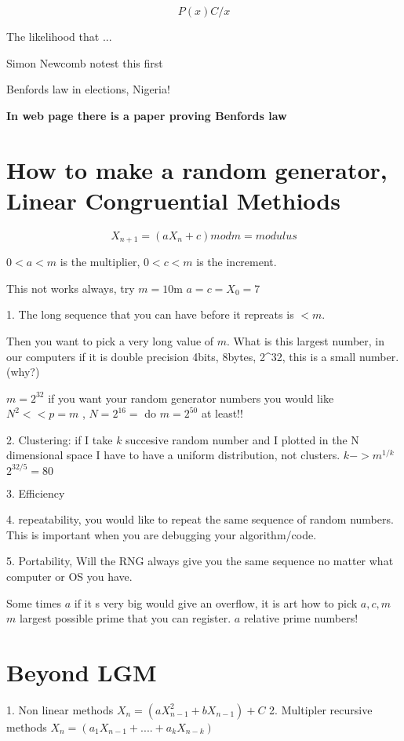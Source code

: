 \documentclass[12pt]{article}
\begin{document}
\begin{equation}
P(x)  C/x
\end{equation}

The likelihood that ...

Simon Newcomb notest this first

Benfords law in elections, Nigeria!

\textbf{In web page there is a paper proving Benfords law}

\section{How to make a random generator, Linear Congruential Methiods}

\begin{equation}
X_{n+1} = (a X_n + c)mod   m=modulus
\end{equation}

$0<a<m$ is the multiplier, $0<c<m$ is the increment.

This not works always, try $m=10$m $a=c=X_0=7$

1. The long sequence that you can have before it repreats is $<m$.

Then you want to pick a very long value of $m$. What is this largest
number, in our computers if it is double precision 4bits, 8bytes, 2^32, this is a small
number. (why?)

$m=2^{32}$ if you want your random generator numbers you would like
$N^2 << p = m$ , $N = 2^{16} = $
do $m=2^{50}$ at least!!

2. Clustering: if I take $k$ succesive random number and I plotted in
the N dimensional space I have to have a uniform distribution, not
clusters. $k-> m^{1/k}$ $2^{32/5} = 80$

3. Efficiency

4. repeatability, you would like to repeat the same sequence of random
numbers. This is important when you are debugging your
algorithm/code. 

5. Portability, Will the RNG always give you the same sequence no
matter what computer or OS you have.

Some times $a$ if it s very big would give an overflow, it is art how
to pick $a, c, m$ $m$ largest possible prime that you can register. $a$
relative prime numbers!

\section{Beyond LGM}

1. Non linear methods
$X_{n} = (a X^{2}_{n-1} + bX_{n-1}) + C$
2. Multipler recursive methods
$X_n = (a_1 X_{n-1} + .... + a_k X_{n-k})$
\end{document}
